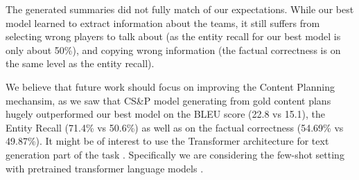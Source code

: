 The generated summaries did not fully match of our expectations. While our best model learned to extract information about the teams, it still suffers from selecting wrong players to talk about (as the entity recall for our best model is only about 50\%), and copying wrong information (the factual correctness is on the same level as the entity recall).

We believe that future work should focus on improving the Content Planning mechansim, as we saw that CS\&P model generating from gold content plans hugely outperformed our best model on the BLEU score (22.8 vs 15.1), the Entity Recall (71.4\% vs 50.6\%) as well as on the factual correctness (54.69\% vs 49.87\%). It might be of interest to use the Transformer architecture for text generation part of the task \citep{vaswani2017attention}. Specifically we are considering the few-shot setting with pretrained transformer language models \citep{chen2020fewshot}.